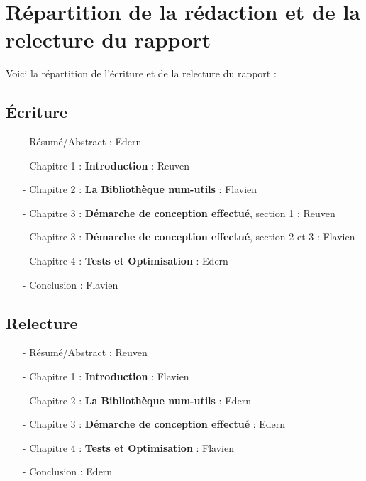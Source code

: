 \chapter*{R\'epartition de la r\'edaction et de la relecture du rapport}

Voici la r\'epartition de l'\'ecriture et de la relecture du rapport :
\newline
\section*{\'Ecriture}
\begin{itemize}
  \item[-] R\'esum\'e/Abstract : Edern
  \item[-] Chapitre 1 : \textbf{Introduction} : Reuven
  \item[-] Chapitre 2 : \textbf{La Biblioth\`eque num-utils} : Flavien
  \item[-] Chapitre 3 : \textbf{D\'emarche de conception effectu\'e}, section 1 : Reuven
  \item[-] Chapitre 3 : \textbf{D\'emarche de conception effectu\'e}, section 2 et 3 : Flavien
  \item[-] Chapitre 4 : \textbf{Tests et Optimisation} : Edern
  \item[-] Conclusion : Flavien
\newline
\end{itemize}
\section*{Relecture}
\begin{itemize}
  \item[-] R\'esum\'e/Abstract : Reuven
  \item[-] Chapitre 1 : \textbf{Introduction} : Flavien
  \item[-] Chapitre 2 : \textbf{La Biblioth\`eque num-utils} : Edern
  \item[-] Chapitre 3 : \textbf{D\'emarche de conception effectu\'e} : Edern
  \item[-] Chapitre 4 : \textbf{Tests et Optimisation} : Flavien
  \item[-] Conclusion : Edern
\end{itemize}